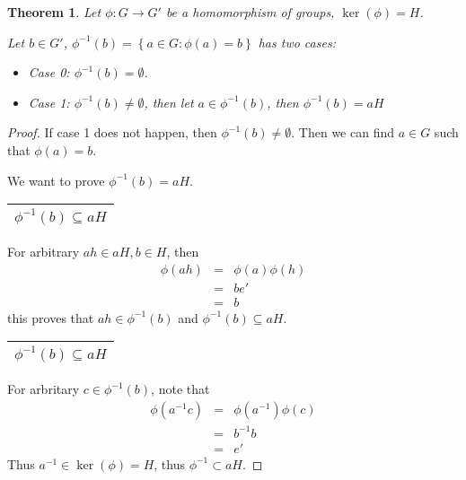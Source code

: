 \documentclass{article}
\theoremstyle{MyNonumberplain}
\theoremstyle{break}
\newtheorem*{proof}{Proof. }
\newcommand{\p}{\phi}
\theoremstyle{break}
\newtheorem{theorem}{Theorem}[section]
\theoremstyle{break}
\theoremstyle{definition}
\theoremstyle{break}
\begin{document}
\begin{thmbox}
    \begin{theorem}
        Let $\p : G \rightarrow G'$ be a homomorphism of groups, $\ker \left( \p
        \right) = H$.\bigskip

        Let $b \in G'$, $\p^{- 1} (b) = \left\{ a \in G : \p (a) = b \right\}$ has
        two cases:\bigskip
        \begin{itemize}
        \item Case 0: $\p^{- 1} (b) = \emptyset$.\bigskip
        
        \item Case 1: $\p^{- 1} (b) \neq \emptyset$, then let $a \in \p^{- 1}
        (b)$, then $\p^{- 1} (b) = a H$
        \end{itemize}
    \end{theorem}
            \begin{prfbox}
                \begin{proof}
                    If case 1 does not happen, then $\p^{- 1} (b) \neq \emptyset$. Then we can
                    find $a \in G$ such that $\p (a) = b$.\bigskip

                    We want to prove $\p^{- 1} (b) = a H$.\bigskip

                    \begin{tabular}{|c|}
                    \hline
                    $\p^{- 1} (b) \subseteq a H$\\
                    \hline
                    \end{tabular}\bigskip

                    For arbitrary $a h \in a H, b \in H$, then
                    \begin{eqnarray*}
                    \p (a h) & = & \p (a) \p (h)\\
                    & = & b e'\\
                    & = & b
                    \end{eqnarray*}
                    this proves that $a h \in \p^{- 1} (b)$ and $\p^{- 1} (b) \subseteq a H$.\bigskip

                    \begin{tabular}{|c|}
                    \hline
                    $\p^{- 1} (b) \subseteq a H$\\
                    \hline
                    \end{tabular}\bigskip

                    For arbritary $c \in \p^{- 1} (b)$, note that
                    \begin{eqnarray*}
                    \p (a^{- 1} c) & = & \p (a^{- 1}) \p (c)\\
                    & = & b^{- 1} b\\
                    & = & e'
                    \end{eqnarray*}
                    Thus $a^{- 1} \in \ker \left( \p \right) = H$, thus $\p^{- 1} \subset a H$.\bigskip


\end{proof}
\end{prfbox}
\end{thmbox}
\end{document}
